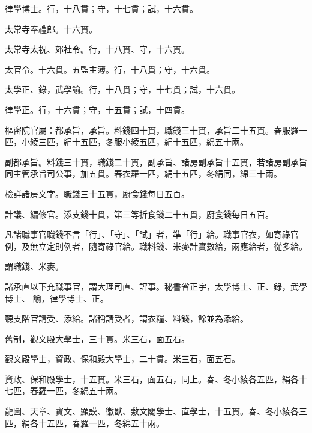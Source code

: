\begin{pinyinscope}
 律學博士。行，十八貫；守，十七貫；試，十六貫。



 太常寺奉禮郎。十六貫。



 太常寺太祝、郊社令。行，十八貫、守，十六貫。



 太官令。十六貫。五監主簿。行，十八貫；守，十六貫。



 太學正、錄，武學諭。行，十八貫；守，十七貫；試，十六貫。



 律學正。行，十六貫；守，十五貫；試，十四貫。



 樞密院官屬：都承旨，承旨。料錢四十貫，職錢三十貫，承旨二十五貫。春服羅一匹，小綾三匹，絹十五匹，冬服小綾五匹，絹十五匹，綿五十兩。



 副都承旨。料錢三十貫，職錢二十貫，副承旨、諸房副承旨十五貫，若諸房副承旨同主管承旨司公事，加五貫。春衣羅一匹，絹十五匹，冬絹同，綿三十兩。



 檢詳諸房文字。職錢三十五貫，廚食錢每日五百。



 計議、編修官。添支錢十貫，第三等折食錢二十五貫，廚食錢每日五百。



 凡諸職事官職錢不言「行」、「守」、「試」者，準「行」給。職事官衣，如寄祿官例，及無立定則例者，隨寄祿官給。職料錢、米麥計實數給，兩應給者，從多給。



 謂職錢、米麥。



 諸承直以下充職事官，謂大理司直、評事。秘書省正字，太學博士、正、錄，武學博士、
 諭，律學博士、正。



 聽支階官請受、添給。諸稱請受者，謂衣糧、料錢，餘並為添給。



 舊制，觀文殿大學士，三十貫。米三石，面五石。



 觀文殿學士，資政、保和殿大學士，二十貫。米三石，面五石。



 資政、保和殿學士，十五貫。米三石，面五石，同上。春、冬小綾各五匹，絹各十七匹，春羅一匹，冬綿五十兩。



 龍圖、天章、寶文、顯謨、徽猷、敷文閣學士、直學士，十五貫。春、冬小綾各三匹，絹各十五匹，春羅一匹，冬綿五十兩。




\end{pinyinscope}
